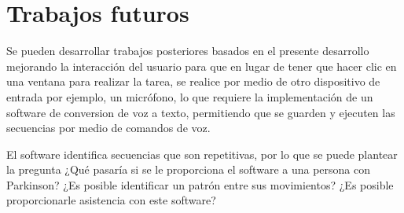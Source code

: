 \section{Trabajos futuros}
Se pueden desarrollar trabajos posteriores basados en el presente desarrollo
 mejorando la interacci\'on del usuario para que en lugar de tener que hacer 
 clic en una ventana para realizar la tarea, se realice por medio de otro 
 dispositivo de entrada por ejemplo, un micr\'ofono, lo que requiere la 
 implementaci\'on de un software de conversion de voz a texto, permitiendo que 
 se guarden y ejecuten las secuencias por medio de comandos de voz. 

El software identifica secuencias que son repetitivas, por lo que se puede
 plantear la pregunta ¿Qué pasaría si se le proporciona el software a una
 persona con Parkinson?  ¿Es posible identificar un patrón entre sus 
 movimientos? ¿Es posible proporcionarle asistencia con este software?
